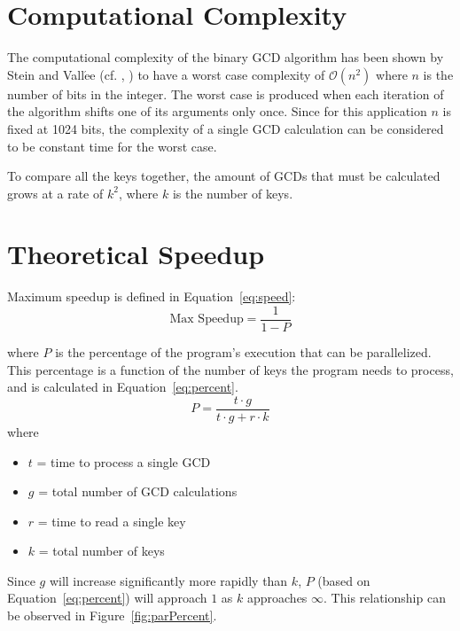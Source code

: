 \documentclass[12pt]{ucthesis}
\begin{document}
\section{Computational Complexity}
\label{subsec:compcomp}
The computational complexity of the binary GCD algorithm has been shown by 
Stein and Vall$\acute{\text{e}}$e (cf. \cite{stein1967computational}, 
\cite{vallee1998complete}) to have a worst case complexity of $\mathcal{O}(n^2)$ 
where $n$ is the number of bits in the integer. The worst case is produced 
when each iteration of the algorithm shifts one of its arguments only once. 
Since for this application $n$ is fixed at 1024 bits, the complexity of a 
single GCD calculation can be considered to be constant time for the worst case.

To compare all the keys together, the amount of GCDs that must be calculated 
grows at a rate of $k^2$, where $k$ is the number of keys.

\section{Theoretical Speedup}
\label{subsec:theory}
Maximum speedup is defined in Equation~\ref{eq:speed}:
\begin{equation}
   \mbox{Max Speedup} = \frac{1}{1 - P}
   \label{eq:speed}
\end{equation}

where $P$ is the percentage of the program's execution that can be parallelized.
This percentage is a function of the number of keys the program needs to 
process, and is calculated in Equation~\ref{eq:percent}.
\begin{equation}
P = \frac{t \cdot g}{t \cdot g + r \cdot k}
   \label{eq:percent}
\end{equation}
where
\begin{itemize}
   \item $t$ = time to process a single GCD
   \item $g$ = total number of GCD calculations
   \item $r$ = time to read a single key
   \item $k$ = total number of keys
\end{itemize}

Since $g$ will increase significantly more rapidly than $k$, $P$ (based on 
Equation~\ref{eq:percent}) will approach $1$ as $k$ approaches 
$\infty$. This relationship can be observed in Figure~\ref{fig:parPercent}.
\end{document}
